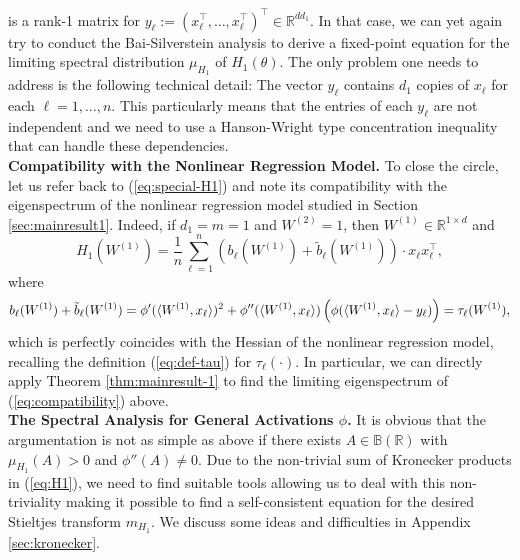 \documentclass{article}
\begin{document}
is a rank-1 matrix for $y_\ell:=(x_\ell^\top,\dots,x_\ell^\top)^\top\in\mathbb{R}^{dd_1}$. In that case, we can yet again try to conduct the Bai-Silverstein analysis to derive a fixed-point equation for the limiting spectral distribution $\mu_{H_1}$ of $H_1(\theta)$. The only problem one needs to address is the following technical detail: The vector $y_\ell$ contains $d_1$ copies of $x_\ell$ for each $\ell=1,\dots,n$. This particularly means that the entries of each $y_\ell$ are not independent and we need to use a Hanson-Wright type concentration inequality that can handle these dependencies.
\bigskip
\bigskip
\\
\textbf{Compatibility with the Nonlinear Regression Model.} To close the circle, let us refer back to (\ref{eq:special-H1}) and note its compatibility with the eigenspectrum of the nonlinear regression model studied in Section \ref{sec:mainresult1}. Indeed, if $d_1=m=1$ and $W^{(2)}=1$, then $W^{(1)}\in\mathbb{R}^{1\times d}$ and
\begin{equation}
H_1(W^{(1)})=\frac{1}{n}\sum_{\ell=1}^n \left(b_\ell(W^{(1)})+\tilde{b}_\ell(W^{(1)})\right)\cdot x_\ell x_\ell^\top,\label{eq:compatibility}
\end{equation}
where
\begin{equation}
b_\ell(W^{(1)})+\tilde{b}_\ell(W^{(1)})=\phi'(\langle W^{(1)},x_\ell\rangle)^2+\phi''(\langle W^{(1)},x_\ell\rangle)\left(\phi(\langle W^{(1)},x_\ell\rangle-y_\ell)\right)=\tau_\ell(W^{(1)}), \notag
\end{equation}
which is perfectly coincides with the Hessian of the nonlinear regression model, recalling the definition (\ref{eq:def-tau}) for $\tau_\ell(\cdot)$. In particular, we can directly apply Theorem \ref{thm:mainresult-1} to find the limiting eigenspectrum of (\ref{eq:compatibility}) above.
\bigskip
\bigskip
\\
\textbf{The Spectral Analysis for General Activations $\phi$.} It is obvious that the argumentation is not as simple as above if there exists $A\in\mathbb{B}(\mathbb{R})$  with $\mu_{H_1}(A)>0$ and $\phi''(A)\neq0$. Due to the non-trivial sum of Kronecker products in (\ref{eq:H1}), we need to find suitable tools allowing us to deal with this non-triviality making it possible to find a self-consistent equation for the desired Stieltjes transform $m_{H_1}$. We discuss some ideas and difficulties in Appendix \ref{sec:kronecker}.

\newpage
\end{document}
